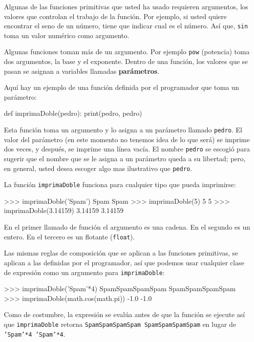 \label{parameters}  
 

Algunas de las funciones primitivas que usted ha usado requieren argumentos,
los valores que controlan el trabajo de la función. Por ejemplo, si
usted quiere encontrar el seno de un número, tiene que indicar cual
es el número. Así que, \texttt{sin} toma un valor numérico como argumento.

Algunas funciones toman más de un argumento. Por ejemplo \texttt{pow}
(potencia) toma dos argumentos, la base y el exponente. Dentro de
una función, los valores que se pasan se asignan a variables llamadas
\textbf{parámetros}.

Aquí hay un ejemplo de una función definida por el programador que
toma un parámetro:

\begin{pythoncode}
def imprimaDoble(pedro):
  print(pedro, pedro)
\end{pythoncode}
 Esta función toma un argumento y lo asigna a un parámetro llamado
\texttt{pedro}. El valor del parámetro (en este momento no tenemos
idea de lo que será) se imprime dos veces, y después, se imprime una
línea vacía. El nombre \texttt{pedro} se escogió para sugerir que
el nombre que se le asigna a un parámetro queda a su libertad; pero,
en general, usted desea escoger algo mas ilustrativo que \texttt{pedro}.

La función \texttt{imprimaDoble} funciona para cualquier tipo que
pueda imprimirse:

\begin{pyconcode}
>>> imprimaDoble('Spam')
Spam Spam
>>> imprimaDoble(5)
5 5
>>> imprimaDoble(3.14159)
3.14159 3.14159
\end{pyconcode}
 En el primer llamado de función el argumento es una cadena. En el
segundo es un entero. En el tercero es un flotante (\texttt{float}).

Las mismas reglas de composición que se aplican a las funciones primitivas,
se aplican a las definidas por el programador, así que podemos usar
cualquier clase de expresión como un argumento para \texttt{imprimaDoble}:

\begin{pyconcode}
>>> imprimaDoble('Spam'*4)
SpamSpamSpamSpam SpamSpamSpamSpam
>>> imprimaDoble(math.cos(math.pi))
-1.0 -1.0
\end{pyconcode}
 Como de costumbre, la expresión se evalúa antes de que la función
se ejecute así que \texttt{imprimaDoble} retorna \texttt{SpamSpamSpamSpam
SpamSpamSpamSpam} en lugar de \texttt{'Spam'{*}4 'Spam'{*}4}.

